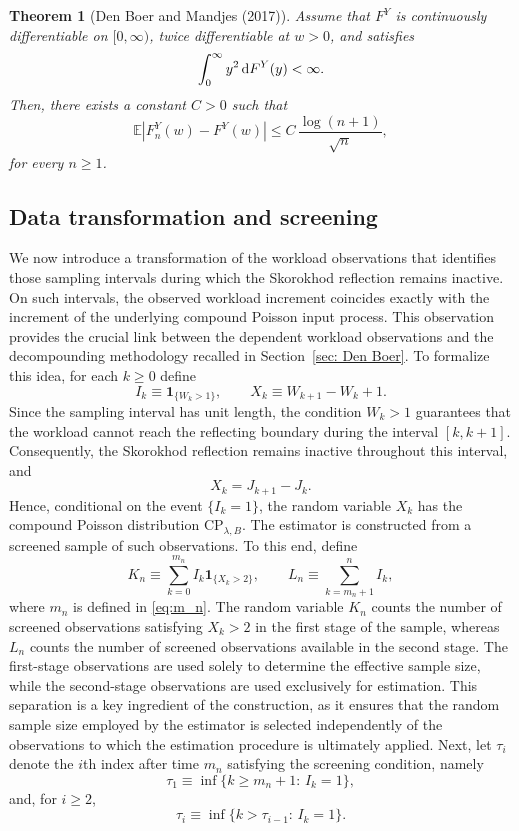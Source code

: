 \documentclass[12pt]{article}
\newtheorem{theorem}{Theorem}
\newcommand{\1}{\mathbf{1}}
\begin{document}
\begin{theorem}[Den Boer and Mandjes (2017)]\label{thm: Den Boer}
Assume that $F^Y$ is continuously differentiable on $[0,\infty)$, twice differentiable at $w>0$, and satisfies
\[
\int_0^\infty y^2\,{\rm d}F^Y(y)<\infty.
\]
Then, there exists a constant $C>0$ such that
\[
\mathbb E\!\left|F_n^Y(w)-F^Y(w)\right|
\le
C\,\frac{\log(n+1)}{\sqrt n},
\]
for every $n\ge1$.
\end{theorem}

\subsection{Data transformation and screening}
We now introduce a transformation of the workload observations that identifies those sampling intervals during which the Skorokhod reflection remains inactive. On such intervals, the observed workload increment coincides exactly with the increment of the underlying compound Poisson input process. This observation provides the crucial link between the dependent workload observations and the decompounding methodology recalled in Section~\ref{sec: Den Boer}. To formalize this idea, for each $k\ge0$ define \[ I_k\equiv\mathbf1_{\{W_k>1\}}, \qquad X_k\equiv W_{k+1}-W_k+1. \] Since the sampling interval has unit length, the condition $W_k>1$ guarantees that the workload cannot reach the reflecting boundary during the interval $[k,k+1]$. Consequently, the Skorokhod reflection remains inactive throughout this interval, and \[ X_k=J_{k+1}-J_k. \] Hence, conditional on the event $\{I_k=1\}$, the random variable $X_k$ has the compound Poisson distribution $\mathrm{CP}_{\lambda,B}$. The estimator is constructed from a screened sample of such observations. To this end, define \[ K_n \equiv \sum_{k=0}^{m_n} I_k\mathbf1_{\{X_k>2\}}, \qquad L_n \equiv \sum_{k=m_n+1}^{n} I_k, \] where $m_n$ is defined in \eqref{eq:m_n}. The random variable $K_n$ counts the number of screened observations satisfying $X_k>2$ in the first stage of the sample, whereas $L_n$ counts the number of screened observations available in the second stage. The first-stage observations are used solely to determine the effective sample size, while the second-stage observations are used exclusively for estimation. This separation is a key ingredient of the construction, as it ensures that the random sample size employed by the estimator is selected independently of the observations to which the estimation procedure is ultimately applied. Next, let $\tau_i$ denote the $i$th index after time $m_n$ satisfying the screening condition, namely \[ \tau_1 \equiv \inf\{k\ge m_n+1:\,I_k=1\}, \] and, for $i\ge2$, \[ \tau_i \equiv \inf\{k>\tau_{i-1}:\,I_k=1\}. \] 
\end{document}
